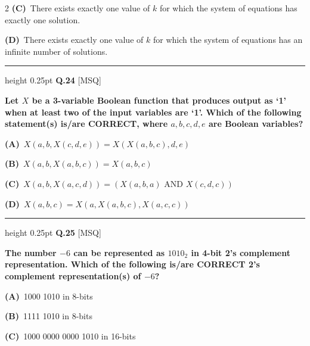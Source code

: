 \documentclass[a4paper,10pt,twoside]{article}
\begin{document}
\begin{multicols}{2}
\textbf{(C)}~There exists exactly one value of $k$ for which the system of equations has exactly one solution.\par\vspace{2pt}\noindent
\textbf{(D)}~There exists exactly one value of $k$ for which the system of equations has an infinite number of solutions.
\par\vspace{6pt}\hrule height 0.25pt\vspace{6pt}
\noindent\textbf{Q.24} \hfill {\footnotesize\textsf{[MSQ]}}
\par\vspace{2pt}
{\bfseries Let $X$ be a 3-variable Boolean function that produces output as `1' when at least two of the input variables are `1'. Which of the following statement(s) is/are CORRECT, where $a, b, c, d, e$ are Boolean variables? \par}
\par\vspace{2pt}\noindent
\textbf{(A)}~$X(a, b, X(c, d, e)) = X(X(a, b, c), d, e)$\par\vspace{2pt}\noindent
\textbf{(B)}~$X(a, b, X(a, b, c)) = X(a, b, c)$\par\vspace{2pt}\noindent
\textbf{(C)}~$X(a, b, X(a, c, d)) = (X(a, b, a) \text{ AND } X(c, d, c))$\par\vspace{2pt}\noindent
\textbf{(D)}~$X(a, b, c) = X(a, X(a, b, c), X(a, c, c))$
\par\vspace{6pt}\hrule height 0.25pt\vspace{6pt}
\noindent\textbf{Q.25} \hfill {\footnotesize\textsf{[MSQ]}}
\par\vspace{2pt}
{\bfseries The number $-6$ can be represented as $1010_2$ in 4-bit 2's complement representation. Which of the following is/are CORRECT 2's complement representation(s) of $-6$? \par}
\par\vspace{2pt}\noindent
\textbf{(A)}~1000 1010 in 8-bits\par\vspace{2pt}\noindent
\textbf{(B)}~1111 1010 in 8-bits\par\vspace{2pt}\noindent
\textbf{(C)}~1000 0000 0000 1010 in 16-bits\par\vspace{2pt}\noindent

\end{multicols}
\end{document}
